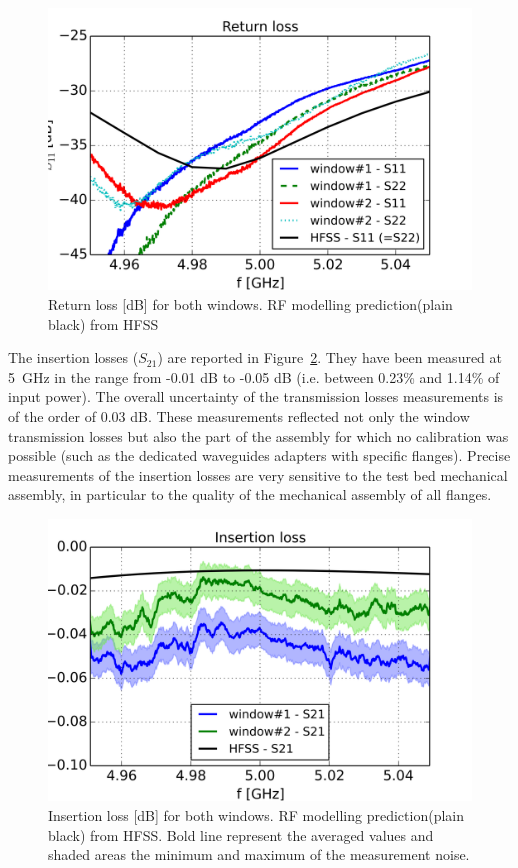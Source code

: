 \begin{figure}
	\centering
	\includegraphics[width=1.0\linewidth]{figures/chap3/ITER_window/ITER_windows_RL}
	\caption{Return loss [\si{dB}] for both windows. RF modelling prediction(plain black) from HFSS}
	\label{fig:iterwindowsrl}
\end{figure}

The insertion losses ($S_{21}$) are reported in Figure~\ref{fig:iterwindowsil}. They have been measured at 5~GHz in the range from -0.01 dB to -0.05 dB (i.e. between 0.23\% and 1.14\% of input power). The overall uncertainty of the transmission losses measurements is of the order of 0.03 dB. These measurements reflected not only the window transmission losses but also the part of the assembly for which no calibration was possible (such as the dedicated waveguides adapters with specific flanges). Precise measurements of the insertion losses are very sensitive to the test bed mechanical assembly, in particular to the quality of the mechanical assembly of all flanges.  

\begin{figure}
	\centering
	\includegraphics[width=1.0\linewidth]{figures/chap3/ITER_window/ITER_windows_IL}
	\caption{Insertion loss [dB] for both windows. RF modelling prediction(plain black) from HFSS. Bold line represent the averaged values and shaded areas the minimum and maximum of the measurement noise.}
	\label{fig:iterwindowsil}
\end{figure}


